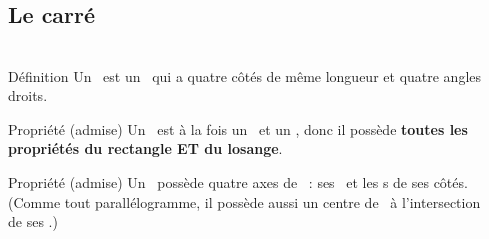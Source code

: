 \documentclass{beamer}
\begin{document}
\subsection{Le carré}

\begin{frame}
	\frametitle{}  
	\framesubtitle{}
	
	\begin{columns}[onlytextwidth]	
		\begin{column}{0.65\textwidth}
			\begin{exampleblock}{Définition}
				Un \car\ est un \myquad\ qui a quatre côtés de même longueur et quatre angles droits.
			\end{exampleblock}
			
			\begin{alertblock}{Propriété (admise)}
				Un \car\ est à la fois un \rect\ et un \los , donc il possède \textbf{toutes les propriétés du rectangle ET du losange}.
			\end{alertblock}
			
			\begin{alertblock}{Propriété (admise)}
				Un \car\ possède quatre axes de \sym\ : ses \diags\ et les \mediat s de ses côtés. (Comme tout parallélogramme, il possède aussi un centre de \sym\ à l'intersection de ses \diags .)
			\end{alertblock}
			
		\end{column}
		\begin{column}{0.35\textwidth}
		\end{column}	
	\end{columns}
\end{frame}
\end{document}
